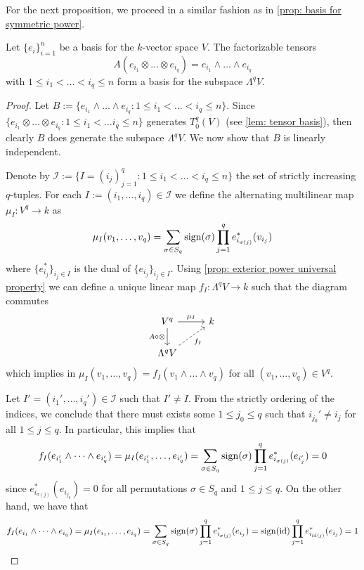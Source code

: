 For the next proposition, we proceed in a similar fashion as in \cref{prop:
basis for symmetric power}.

\begin{proposition}
  \label{prop: exterior power basis}
  Let \(\{e_i\}_{i=1}^n\) be a basis for the \(k\)-vector space \(V\). The
  factorizable tensors
  \[
    A(e_{i_1} \otimes \dots \otimes e_{i_q}) = e_{i_1} \wedge \dots \wedge
    e_{i_q}
  \]
  with \(1 \leq i_1 < \dots < i_q \leq n\) form a basis for the subspace
  \(\Lambda^q V\).
\end{proposition}

\begin{proof}
  Let \(B := \{e_{i_1} \wedge \dots \wedge e_{i_q} : 1 \leq i_1 < \dots < i_q
  \leq n\}\). Since \(\{e_{i_1} \otimes \dots \otimes e_{i_q} : 1 \leq i_1 <
  \dots i_q \leq n\}\) generates \(T_0^q(V)\) (see \cref{lem: tensor basis}),
  then clearly \(B\) does generate the subspace \(\Lambda^q V\). We now show
  that \(B\) is linearly independent.

  Denote by \(\mathcal I := \{I = (i_j)_{j=1}^q : 1 \leq i_1 < \dots < i_q \leq
  n\}\) the set of strictly increasing \(q\)-tuples. For each \(I := (i_1,
  \dots, i_q) \in \mathcal I\) we define the alternating multilinear map \(\mu_I
  : V^q \to k\) as
  \[
    \mu_I(v_1, \dots, v_q) = \sum_{\sigma \in S_q}
    \operatorname{sign}(\sigma) \prod_{j=1}^q e_{i_{\sigma(j)}}^*(v_{i_j})
  \]
  where \(\{e_{i_j}^*\}_{i_j \in I}\) is the dual of \(\{e_{i_j}\}_{i_j
  \in I}\). Using \cref{prop: exterior power universal property} we can
  define a unique linear map \(f_I: \Lambda^q V \to k\) such that the diagram
  commutes
  \[
    \begin{tikzcd}
      V^q \ar[r, "\mu_I"] \ar[d, swap, "A \circ \otimes"] &k \\
      \Lambda^q V \ar[ur, dashed, swap, "f_I"]
    \end{tikzcd}
  \]
  which implies in \(\mu_I(v_1, \dots, v_q) = f_I(v_1 \wedge \dots \wedge v_q)\)
  for all \((v_1, \dots, v_q) \in V^q\).

  Let \(I' = (i_1', \dots, i_q') \in \mathcal I\) such that \(I' \neq I\). From
  the strictly ordering of the indices, we conclude that there must exists some
  \(1 \leq j_0 \leq q\) such that \(i_{j_0}' \neq i_j\) for all \(1 \leq j \leq
  q\). In particular, this implies that
  \[
    f_I(e_{i_1'} \wedge \dots \wedge e_{i_q'}) = \mu_I(e_{i_1'}, \dots,
    e_{i_q'}) = \sum_{\sigma \in S_q} \operatorname{sign}(\sigma)
    \prod_{j=1}^q e_{i_{\sigma(j)}}^*(e_{i_j'}) = 0
  \]
  since \(e_{i_{\sigma(j)}}^*(e_{i_{j_0}}) = 0\) for all permutations \(\sigma
  \in S_q\) and \(1 \leq j \leq q\). On the other hand, we have that
  \[
    f_I(e_{i_1} \wedge \dots \wedge e_{i_q}) = \mu_I(e_{i_1}, \dots, e_{i_q})
    = \sum_{\sigma \in S_q} \operatorname{sign}(\sigma) \prod_{j=1}^q
    e_{i_{\sigma(j)}}^*(e_{i_j})
    = \operatorname{sign}(\operatorname{id}) \prod_{j=1}^q e_{i_{\operatorname{id}(j)}}^*(e_{i_j})
    = 1
  \]


\end{proof}
